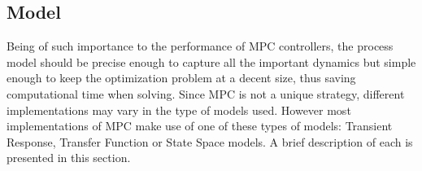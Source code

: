 \subsection{Model}%

Being of such importance to the performance of MPC controllers, the process model should be precise enough to capture all the important dynamics but simple enough to keep the optimization problem at a decent size, thus saving computational time when solving. Since MPC is not a unique strategy, different implementations may vary in the type of models used. However most implementations of MPC make use of one of these types of models: Transient Response, Transfer Function or State Space models. A brief description of each is presented in this section.

